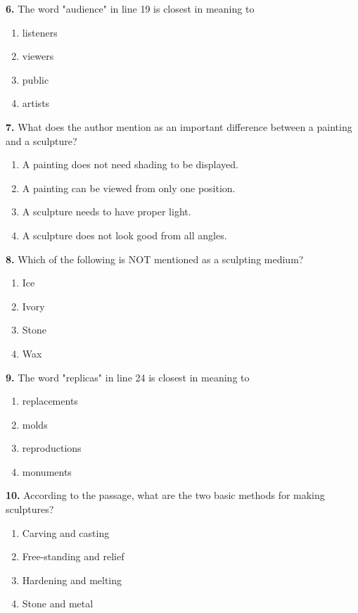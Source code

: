 \documentclass[12pt]{article}
\begin{document}
\vspace{0.25\baselineskip}
\noindent\textbf{6.} The word "audience" in line 19 is closest in meaning to
\begin{enumerate}[label=(\Alph*),leftmargin=*,itemsep=0.2em]
\item listeners
\item viewers
\item public
\item artists
\end{enumerate}
\par
\vspace{0.25\baselineskip}
\noindent\textbf{7.} What does the author mention as an important difference between a painting and a sculpture?
\begin{enumerate}[label=(\Alph*),leftmargin=*,itemsep=0.2em]
\item A painting does not need shading to be displayed.
\item A painting can be viewed from only one position.
\item A sculpture needs to have proper light.
\item A sculpture does not look good from all angles.
\end{enumerate}
\par
\vspace{0.25\baselineskip}
\noindent\textbf{8.} Which of the following is NOT mentioned as a sculpting medium?
\begin{enumerate}[label=(\Alph*),leftmargin=*,itemsep=0.2em]
\item Ice
\item Ivory
\item Stone
\item Wax
\end{enumerate}
\par
\vspace{0.25\baselineskip}
\noindent\textbf{9.} The word "replicas" in line 24 is closest in meaning to
\begin{enumerate}[label=(\Alph*),leftmargin=*,itemsep=0.2em]
\item replacements
\item molds
\item reproductions
\item monuments
\end{enumerate}
\par
\vspace{0.25\baselineskip}
\noindent\textbf{10.} According to the passage, what are the two basic methods for making sculptures?
\begin{enumerate}[label=(\Alph*),leftmargin=*,itemsep=0.2em]
\item Carving and casting
\item Free-standing and relief
\item Hardening and melting
\item Stone and metal
\end{enumerate}
\par
\vspace{0.25\baselineskip}
\end{document}
